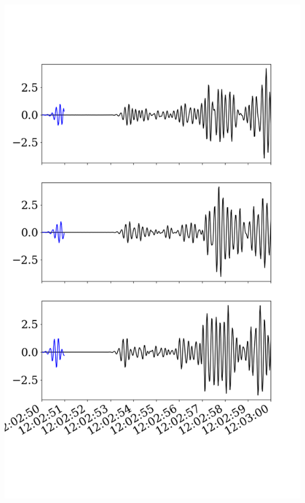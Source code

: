 \documentclass{beamer}
\begin{document}
\begin{frame}
\begin{minipage}{0.4\linewidth}
    \includegraphics[width=1.2\linewidth]{images/fig_0.png}
 \end{minipage}
 
\end{frame}
\end{document}
